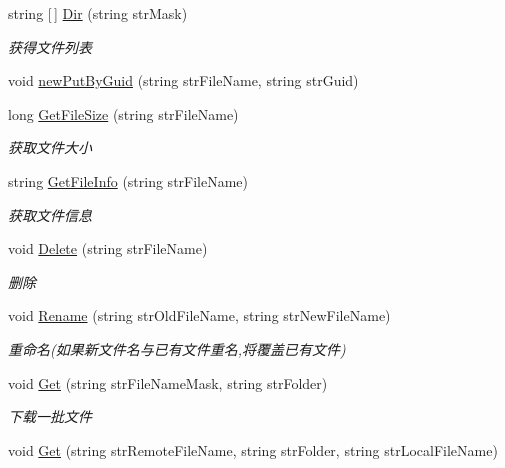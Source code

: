 \begin{DoxyCompactItemize}
string \mbox{[}$\,$\mbox{]} \hyperlink{class_x_c_l_net_tools_1_1_f_t_p_1_1_f_t_p_client_a9563c1fa35e755073b9b279caaf7e354}{Dir} (string str\+Mask)
\begin{DoxyCompactList}\small\item\em 获得文件列表 \end{DoxyCompactList}\item 
void \hyperlink{class_x_c_l_net_tools_1_1_f_t_p_1_1_f_t_p_client_a502eb52b0575947170695c4fcbccc10a}{new\+Put\+By\+Guid} (string str\+File\+Name, string str\+Guid)
\item 
long \hyperlink{class_x_c_l_net_tools_1_1_f_t_p_1_1_f_t_p_client_a39be7d18214835a62484226fc12e2061}{Get\+File\+Size} (string str\+File\+Name)
\begin{DoxyCompactList}\small\item\em 获取文件大小 \end{DoxyCompactList}\item 
string \hyperlink{class_x_c_l_net_tools_1_1_f_t_p_1_1_f_t_p_client_abcdeced5a90923ad5788251d4012694f}{Get\+File\+Info} (string str\+File\+Name)
\begin{DoxyCompactList}\small\item\em 获取文件信息 \end{DoxyCompactList}\item 
void \hyperlink{class_x_c_l_net_tools_1_1_f_t_p_1_1_f_t_p_client_a1be296574d7342283c236d8b51ca2b04}{Delete} (string str\+File\+Name)
\begin{DoxyCompactList}\small\item\em 删除 \end{DoxyCompactList}\item 
void \hyperlink{class_x_c_l_net_tools_1_1_f_t_p_1_1_f_t_p_client_aaadb1ae86c64e8ec958e8333fc6b9bce}{Rename} (string str\+Old\+File\+Name, string str\+New\+File\+Name)
\begin{DoxyCompactList}\small\item\em 重命名(如果新文件名与已有文件重名,将覆盖已有文件) \end{DoxyCompactList}\item 
void \hyperlink{class_x_c_l_net_tools_1_1_f_t_p_1_1_f_t_p_client_a67852a51f561336c777b896af2e95990}{Get} (string str\+File\+Name\+Mask, string str\+Folder)
\begin{DoxyCompactList}\small\item\em 下载一批文件 \end{DoxyCompactList}\item 
void \hyperlink{class_x_c_l_net_tools_1_1_f_t_p_1_1_f_t_p_client_a87ce6305af9ccb5e04b0669bd0eac812}{Get} (string str\+Remote\+File\+Name, string str\+Folder, string str\+Local\+File\+Name)

\end{DoxyCompactItemize}
